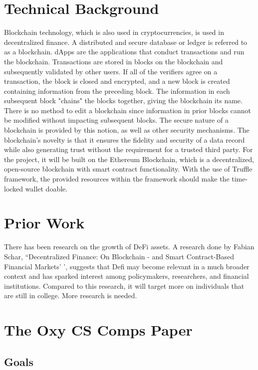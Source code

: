 \documentclass[10pt,twocolumn]{article}
\begin{document}
\section{Technical Background}
Blockchain technology, which is also used in cryptocurrencies, is used in decentralized finance. A distributed and secure database or ledger is referred to as a blockchain. dApps are the applications that conduct transactions and run the blockchain. Transactions are stored in blocks on the blockchain and subsequently validated by other users. If all of the verifiers agree on a transaction, the block is closed and encrypted, and a new block is created containing information from the preceding block. The information in each subsequent block "chains" the blocks together, giving the blockchain its name. There is no method to edit a blockchain since information in prior blocks cannot be modified without impacting subsequent blocks. The secure nature of a blockchain is provided by this notion, as well as other security mechanisms.
	The blockchain's novelty is that it ensures the fidelity and security of a data record while also generating trust without the requirement for a trusted third party.
	For the project, it will be built on the Ethereum Blockchain, which is a decentralized, open-source blockchain with smart contract functionality. With the use of Truffle framework, the provided resources within the framework should make the time-locked wallet doable.

\section{Prior Work}
There has been research on the growth of DeFi assets. A research done by Fabian Schar, “Decentralized Finance: On Blockchain - and Smart Contract-Based Financial Markets' ', suggests that Defi may become relevant in a much broader context and has sparked interest among policymakers, researchers, and financial institutions. Compared to this research, it will target more on individuals that are still in college.
More research is needed.

\section{The Oxy CS Comps Paper}

\subsection{Goals}
\end{document}
